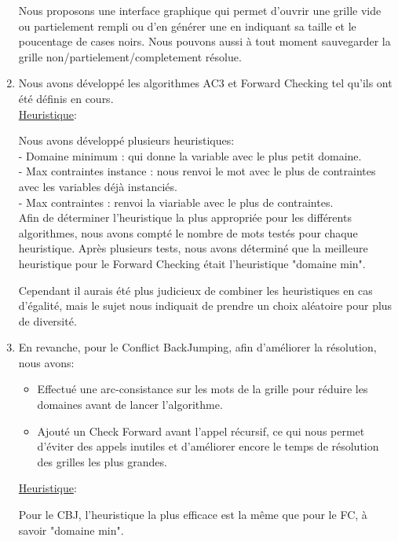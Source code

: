 \documentclass[a4paper,12pt]{report}
\begin{document}
\begin{enumerate}
Nous proposons une interface graphique qui permet d'ouvrir une grille vide ou partielement rempli ou d'en générer une en indiquant sa taille et le poucentage de cases noirs. Nous pouvons aussi à tout moment sauvegarder la grille non/partielement/completement résolue. \\

\item Nous avons développé les algorithmes AC3 et Forward Checking tel qu'ils ont été définis en cours. \\

\ul{Heuristique}:

Nous avons développé plusieurs heuristiques:\\
 - Domaine minimum : qui donne la variable avec le plus petit domaine.\\
 - Max contraintes instance : nous renvoi le mot avec le plus de contraintes avec les variables déjà instanciés.\\
 - Max contraintes : renvoi la viariable avec le plus de contraintes.\\
 
Afin de déterminer l'heuristique la plus appropriée pour les différents algorithmes, nous avons compté le nombre de mots testés pour chaque heuristique.
Après plusieurs tests, nous avons déterminé que la meilleure heuristique pour le Forward Checking était l'heuristique "domaine min". 

Cependant il aurais été plus judicieux de combiner les heuristiques en cas d'égalité, mais le sujet nous indiquait de prendre un choix aléatoire pour plus de diversité.\\

\item En revanche, pour le Conflict BackJumping, afin d'améliorer la résolution, nous avons:
\begin{itemize}
\item Effectué une arc-consistance sur les mots de la grille pour réduire les domaines avant de lancer l'algorithme.
\item Ajouté un Check Forward avant l'appel récursif, ce qui nous permet d'éviter des appels inutiles et d'améliorer encore le temps de résolution des grilles les plus grandes.\\
\end{itemize}

\ul{Heuristique}:

Pour le CBJ, l'heuristique la plus efficace est la même que pour le FC, à savoir "domaine min".\\


\end{enumerate}
\end{document}
